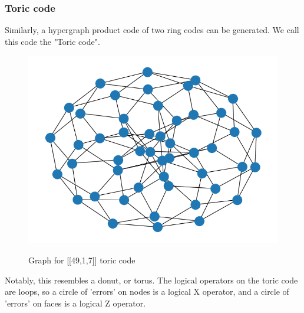 \subsubsection{Toric code}
Similarly, a hypergraph product code of two ring codes can be 
generated. We call this code the "Toric code".\\
\begin{figure}[h!]
	\begin{center}
	\captionsetup{justification=centering,margin=2cm}
	\includegraphics[scale=0.4]{./img/figures/toric_5_graph.png}\\
	\caption{Graph for [[49,1,7]] toric code}
        
	\label{fig: toric_graph}
	\end{center}
\end{figure}
Notably, this resembles a donut, or torus.
The logical operators on the toric code are loops, so a circle of 
'errors' on nodes is a logical X operator, and a circle of 'errors'
on faces is a logical Z operator.
\newpage